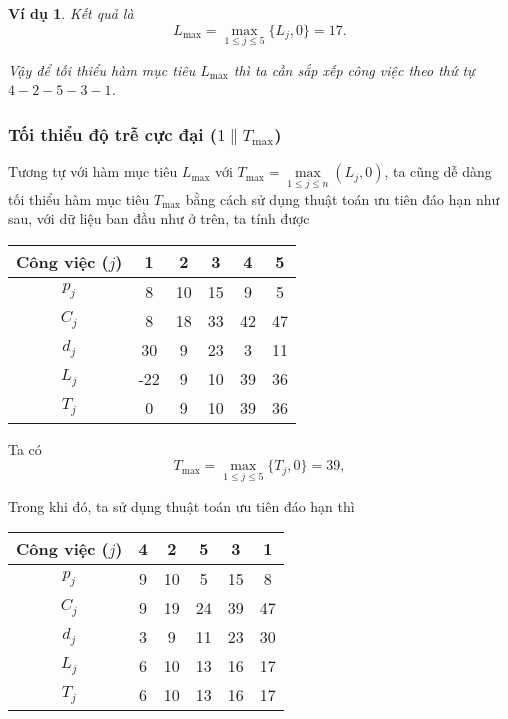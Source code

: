 \documentclass[12pt,a4paper]{report}
\newtheorem{vd}{Ví dụ}
\begin{document}
\begin{vd}
Kết quả là
\begin{equation*}
	L_{\max} = \max _{1 \leq j \leq 5} \{L_j, 0\} = 17.
\end{equation*}

Vậy để tối thiểu hàm mục tiêu $L_{\max}$ thì ta cần sắp xếp công việc theo thứ tự $4-2-5-3-1$.
\end{vd}

\subsubsection*{Tối thiểu độ trễ cực đại ($1 \| T_{\max}$)}
Tương tự với hàm mục tiêu $L_{\max}$ với $T_{\max}=\underset{1 \leq j \leq n}{\max} (L_j,0)$, ta cũng dễ dàng tối thiểu hàm mục tiêu $T_{\max}$ bằng cách sử dụng thuật toán ưu tiên đáo hạn như sau, với dữ liệu ban đầu như ở trên, ta tính được

\begin{table}[h!]
	\centering
	\begin{tabular}{|c | c c c c c |} 
	\hline
	Công việc ($j$) & 1 & 2 & 3 & 4 & 5 \\
	\hline\hline
	$p_j$ & 8 & 10 & 15 & 9 & 5 \\
	$C_j$ & 8 & 18 & 33 & 42 & 47 \\
	$d_j$ & 30 & 9 & 23 & 3 & 11 \\
	$L_j$ & -22 & 9 & 10 & 39 & 36 \\
	$T_j$ & 0 & 9 & 10 & 39 & 36 \\
	\hline
	\end{tabular}
\end{table}
Ta có
\begin{equation*}
	T_{\max} = \max _{1 \leq j \leq 5} \{T_j, 0\} = 39,
\end{equation*}

Trong khi đó, ta sử dụng thuật toán ưu tiên đáo hạn thì

\begin{table}[h!]
	\centering
	\begin{tabular}{|c | c c c c c |} 
	\hline
	Công việc ($j$) & 4 & 2 & 5 & 3 & 1 \\
	\hline\hline
	$p_j$ & 9 & 10 & 5 & 15 & 8 \\
	$C_j$ & 9 & 19 & 24 & 39 & 47 \\
	$d_j$ & 3 & 9 & 11 & 23 & 30 \\
	$L_j$ & 6 & 10 & 13 & 16 & 17 \\
	$T_j$ & 6 & 10 & 13 & 16 & 17 \\
	\hline
	\end{tabular}
\end{table}
\end{document}
